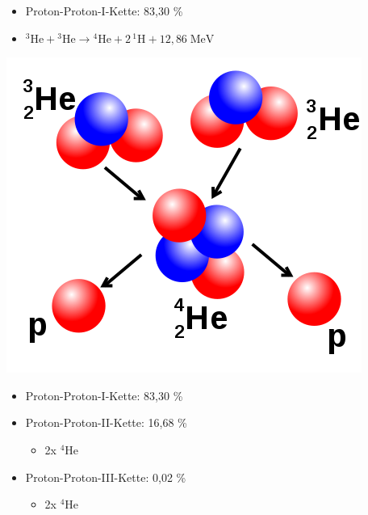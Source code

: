 \documentclass[10pt,a4paper, ngerman]{beamer}
\begin{document}
\begin{frame}{\subsecname}{\secname}
\begin{itemize}
\item Proton-Proton-I-Kette: 83,30 \%
\item \({\displaystyle \mathrm {{}^{3}He+{}^{3}He\to {}^{4}He+2\,{}^{1}H+12{,}86\;MeV} }\)
\end{itemize}
\centering
\includegraphics[height=0.5\textheight]{fids3}
\end{frame}

\begin{frame}{\subsecname}{\secname}
\begin{itemize}
\item Proton-Proton-I-Kette: 83,30 \%
\item Proton-Proton-II-Kette: 16,68 \%
\begin{itemize}
 \item 2x \({\displaystyle \mathrm {{}^{4}He}}\)
\end{itemize}
\item Proton-Proton-III-Kette: 0,02 \%
\begin{itemize}
	\item 2x \({\displaystyle \mathrm {{}^{4}He}}\)
\end{itemize}
\end{itemize}
\end{frame}
\end{document}
